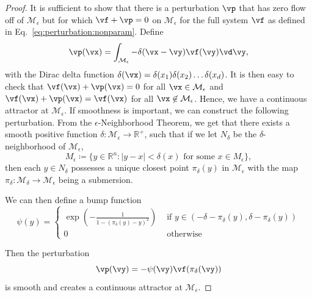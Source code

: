 \documentclass{article} %
\newcounter{ct}
\newcommand{\reals}{\mathbb{R}}
\newcommand{\manifold}{\mathcal{M}}
\theoremstyle{definition}
\theoremstyle{remark}
\newtheorem{remark}{Remark}
\begin{document}
\begin{proof}%
It is sufficient to show that there is a perturbation \(\vp\) that has zero flow off of \(\manifold_\epsilon\) but for which \(\vf+\vp=0\) on \(\manifold_\epsilon\) for the full system \(\vf\)  as defined in Eq.~\ref{eq:perturbation:nonparam}.
Define
\[\vp(\vx) = \int_{\manifold_\epsilon} - \delta(\vx-\vy)\vf(\vy)\vd\vy,\]
 with the Dirac delta function \(\delta(\vx)=\delta(x_1)\delta(x_2)\dots\delta(x_d)\).
It is then easy to check that \(\vf(\vx)+\vp(\vx)=0\) for all \(\vx\in\manifold_\epsilon\) and \(\vf(\vx)+\vp(\vx)=\vf(\vx)\) for all \(\vx\not\in\manifold_\epsilon\).
Hence, we have a continuous attractor at \(\manifold_\epsilon\).
%
If smoothness is important, we can construct the following perturbation.
From the \(\epsilon\)-Neighborhood Theorem\citep{folland1999real}, we get that  there exists a smooth positive function \(\delta\colon \manifold_\epsilon \rightarrow \reals^+\),
 such that if we let \(N_\delta\) be the
\(\delta\)-neighborhood of \(\manifold_\epsilon\),
\[
M_\epsilon\coloneqq \{y  \in \reals^n : |y - x| < \delta(x) \text{ for some }  x \in M_\epsilon\},
\]
then each \(y\in N_\delta\) possesses a unique closest point \(\pi_\delta(y)\) in \(\manifold_\epsilon\) with the map \(\pi_\delta\colon \manifold_\delta \rightarrow \manifold_\epsilon\) being a submersion.

We can then define a bump function
\begin{equation}
\psi(y) =
\begin{cases}
\exp\left(-\frac{1}{1-(\pi_\delta(y)-y)^2}\right) &\text{  if  } y\in(-\delta-\pi_\delta(y), \delta-\pi_\delta(y))\\
0 & \text{  otherwise }
\end{cases}
\end{equation}

Then the perturbation
\[
\vp(\vy) = - \psi(\vy)\vf(\pi_\delta(\vy))
\]
is smooth and creates a continuous attractor at \(\manifold_\epsilon\).
\end{proof}
\end{document}
